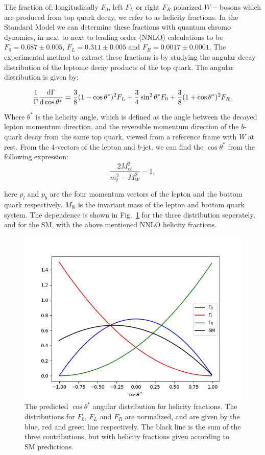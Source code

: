\documentclass[12pt,a4paper]{article}
\begin{document}
The fraction of; longitudinally $F_0$, left $F_L$ or right $F_R$ polarized
$W-$bosons which are produced from top quark decay, we refer to as helicity
fractions. In the Standard Model we can determine these fractions with quantum
chromo dynamics, in next to next to leading order (NNLO) calculations to be
$F_0 = 0.687 \pm 0.005$, $F_L = 0.311 \pm 0.005$ and
$F_R = 0.0017 \pm 0.0001$\cite{Czarnecki_2010}. The experimental method to
extract these fractions is by studying the angular decay distribution of the
leptonic decay products of the top quark. The angular distribution is given by:

\begin{equation}
  \frac{1}{\Gamma}\dv{\Gamma}{\cos \theta^*} = \frac{3}{8}(1-\cos \theta^*)^2 F_L +
  \frac{3}{4}\sin^2 \theta^* F_0 + \frac{3}{8}(1+\cos \theta^*)^2 F_R.
\end{equation}

Where $\theta^*$ is the helicity angle, which is defined as the angle between the
decayed lepton momentum direction, and the reversible momentum direction of the
$b$-quark decay from the same top quark, viewed from a reference frame with $W$
at rest\cite{PhysRevD.45.124}. From the 4-vectors of the lepton and $b$-jet, we
can find the $\cos \theta^*$ from the following expression:
\begin{equation}
  \frac{2 M_{eb}^2}{m_t^2 - M_W^2} - 1, \label{eq:costheta}
\end{equation}

here $p_l$ and $p_b$ are the four momentum vectors of the lepton and the bottom
quark respectively. $M_{lb}$ is the invariant mass of the lepton and bottom
quark system. The dependence is shown in Fig.~\ref{figdistributions} for the three
distribution seperately, and for the SM, with the above mentioned NNLO helicity
fractions.
\begin{figure}[H]
	\includegraphics[width=\linewidth]{angular_dist.png}
	\caption{The predicted $\cos \theta^{*}$ angular distribution for helicity
    fractions. The distributions for $F_{0}$, $F_{L}$ and $F_{R}$ are
    normalized, and are given by the blue, red and green line respectively. The
    black line is the sum of the three contributions, but with helicity
    fractions given according to SM predictions.}\label{figdistributions}
\end{figure}
\end{document}
